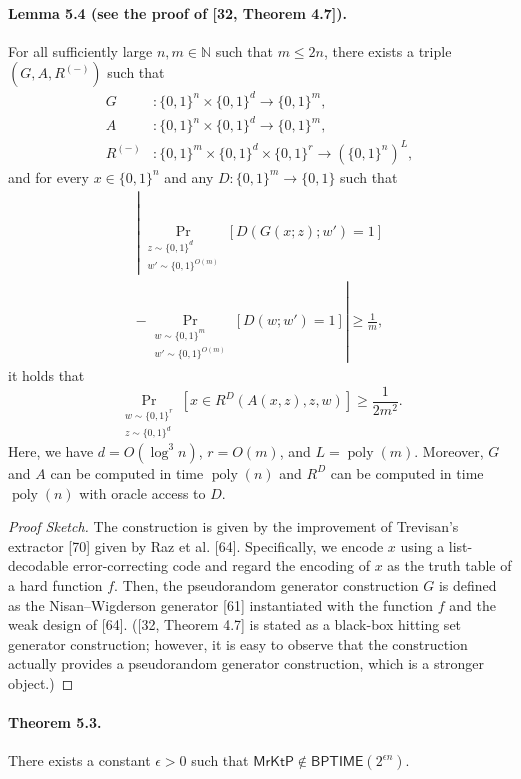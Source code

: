 \documentclass[10pt,a4paper]{article}
\begin{document}
\paragraph{Lemma 5.4 (see the proof of [32, Theorem 4.7]).}
For all sufficiently large $n,m\in\mathbb N$ such that $m\leq2n$, there exists a triple $(G,A,R^{(-)})$ such that
\[\begin{aligned}
G&:\{0,1\}^n\times\{0,1\}^d\to\{0,1\}^m,\\
A&:\{0,1\}^n\times\{0,1\}^d\to\{0,1\}^m,\\
R^{(-)}&:\{0,1\}^m\times\{0,1\}^d\times\{0,1\}^r\to(\{0,1\}^n)^L,
\end{aligned}\]
and for every $x\in\{0,1\}^n$ and any $D:\{0,1\}^m\to\{0,1\}$ such that
\begin{multline*}
\left|\Pr_{\substack{z\sim\{0,1\}^d\\w'\sim\{0,1\}^{O(m)}}}[D(G(x;z);w')=1]\right.\\
\left.-\Pr_{\substack{w\sim\{0,1\}^m\\w'\sim\{0,1\}^{O(m)}}}[D(w;w')=1]\right|\geq\frac1m,
\end{multline*}
it holds that
\[\Pr_{\substack{w\sim\{0,1\}^r\\z\sim\{0,1\}^d}}[x\in R^D(A(x,z),z,w)]\geq\frac1{2m^2}.\]
Here, we have $d=O(\log^3n)$, $r=O(m)$, and $L=\operatorname{poly}(m)$. Moreover, $G$ and $A$ can be computed in time $\operatorname{poly}(n)$ and $R^D$ can be computed in time $\operatorname{poly}(n)$ with oracle access to $D$.
\begin{proof}[Proof Sketch]
The construction is given by the improvement of Trevisan's extractor [70] given by Raz et al. [64]. Specifically, we encode $x$ using a list-decodable error-correcting code and regard the encoding of $x$ as the truth table of a hard function $f$. Then, the pseudorandom generator construction $G$ is defined as the Nisan--Wigderson generator [61] instantiated with the function $f$ and the weak design of [64]. ([32, Theorem 4.7] is stated as a black-box hitting set generator construction; however, it is easy to observe that the construction actually provides a pseudorandom generator construction, which is a stronger object.)
\end{proof}

\paragraph{Theorem 5.3.}
There exists a constant $\epsilon>0$ such that $\mathsf{MrKtP}\notin\mathsf{BPTIME}(2^{\epsilon n})$.
\end{document}
